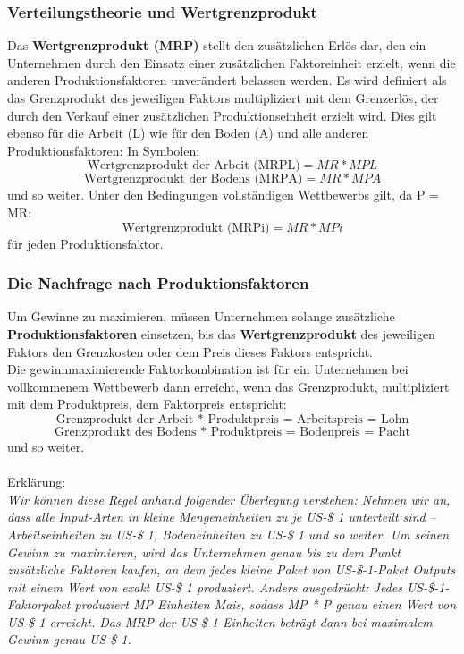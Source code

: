 \documentclass[10pt]{scrartcl}
\begin{document}
\subsubsection{Verteilungstheorie und Wertgrenzprodukt}
Das {\bf Wertgrenzprodukt (MRP) } stellt den zusätzlichen Erlös dar, den ein Unternehmen durch den Einsatz einer zusätzlichen Faktoreinheit erzielt, wenn die anderen Produktionsfaktoren unverändert belassen werden. Es wird definiert als das Grenzprodukt des jeweiligen Faktors multipliziert mit dem Grenzerlös, der durch den Verkauf einer zusätzlichen Produktionseinheit erzielt wird. Dies gilt ebenso für die Arbeit (L) wie für den Boden (A) und alle anderen Produktionsfaktoren: 
In Symbolen:
\begin{equation}
\text{Wertgrenzprodukt der Arbeit (MRPL)} = MR * MPL \nonumber
\end{equation}
\begin{equation}
\text{Wertgrenzprodukt der Bodens (MRPA)} = MR * MPA \nonumber
\end{equation}
und so weiter. Unter den Bedingungen vollständigen Wettbewerbs gilt, da P = MR:\\
\begin{equation}
\text{Wertgrenzprodukt (MRPi)} = MR * MPi \nonumber
\end{equation}
für jeden Produktionsfaktor.
\subsubsection{Die Nachfrage nach Produktionsfaktoren}
Um Gewinne zu maximieren, müssen Unternehmen solange zusätzliche {\bf Produktionsfaktoren } einsetzen, bis das {\bf Wertgrenzprodukt } des jeweiligen Faktors den Grenzkosten oder dem Preis dieses Faktors entspricht.\\
Die gewinnmaximierende Faktorkombination ist für ein Unternehmen bei vollkommenem Wettbewerb dann erreicht, wenn das Grenzprodukt, multipliziert mit dem Produktpreis, dem Faktorpreis entspricht:\\
\begin{equation}
\text{Grenzprodukt der Arbeit * Produktpreis = Arbeitspreis = Lohn} \nonumber
\end{equation}
\begin{equation}
\text{Grenzprodukt des Bodens * Produktpreis = Bodenpreis = Pacht} \nonumber
\end{equation}
und so weiter.\\ \\
Erklärung:\\
{\it Wir können diese Regel anhand folgender Überlegung verstehen: Nehmen wir an, dass alle Input-Arten in kleine Mengeneinheiten zu je US-\$ 1 unterteilt sind –Arbeitseinheiten zu US-\$ 1, Bodeneinheiten zu US-\$ 1 und so weiter. Um seinen Gewinn zu maximieren, wird das Unternehmen genau bis zu dem Punkt zusätzliche Faktoren kaufen, an dem jedes kleine Paket von US-\$-1-Paket Outputs mit einem Wert von exakt US-\$ 1 produziert. Anders ausgedrückt: Jedes US-\$-1-Faktorpaket produziert MP Einheiten Mais, sodass MP * P genau einen Wert von US-\$ 1 erreicht. Das MRP der US-\$-1-Einheiten beträgt dann bei maximalem Gewinn genau US-\$ 1.}\\
\end{document}
